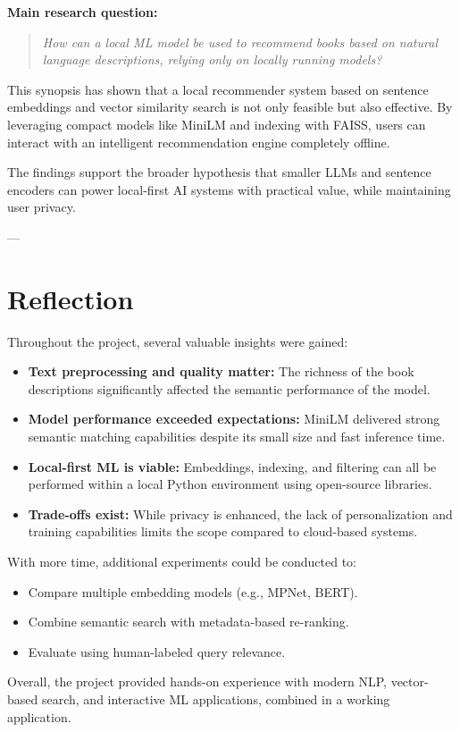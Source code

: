 \textbf{Main research question:}

\begin{quote}
\textit{How can a local ML model be used to recommend books based on natural language descriptions, relying only on locally running models?}
\end{quote}

This synopsis has shown that a local recommender system based on sentence embeddings and vector similarity search is not only feasible but also effective. By leveraging compact models like MiniLM and indexing with FAISS, users can interact with an intelligent recommendation engine completely offline.

The findings support the broader hypothesis that smaller LLMs and sentence encoders can power local-first AI systems with practical value, while maintaining user privacy.

---

\section{Reflection}
\label{sec:reflection}

Throughout the project, several valuable insights were gained:

\begin{itemize}
    \item \textbf{Text preprocessing and quality matter:} The richness of the book descriptions significantly affected the semantic performance of the model.
    \item \textbf{Model performance exceeded expectations:} MiniLM delivered strong semantic matching capabilities despite its small size and fast inference time.
    \item \textbf{Local-first ML is viable:} Embeddings, indexing, and filtering can all be performed within a local Python environment using open-source libraries.
    \item \textbf{Trade-offs exist:} While privacy is enhanced, the lack of personalization and training capabilities limits the scope compared to cloud-based systems.
\end{itemize}

With more time, additional experiments could be conducted to:
\begin{itemize}
    \item Compare multiple embedding models (e.g., MPNet, BERT).
    \item Combine semantic search with metadata-based re-ranking.
    \item Evaluate using human-labeled query relevance.
\end{itemize}

Overall, the project provided hands-on experience with modern NLP, vector-based search, and interactive ML applications, combined in a working application.

